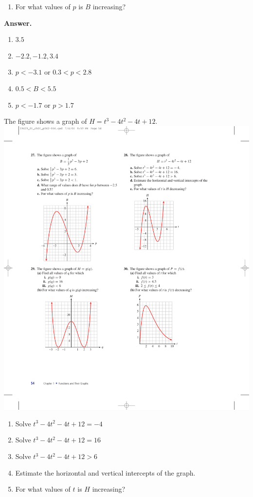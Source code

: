 \documentclass[10pt,]{book}
\theoremstyle{plain}
\theoremstyle{definition}
\theoremstyle{definition}
\theoremstyle{definition}
\theoremstyle{definition}
\numberwithin{equation}{part}
\newcommand{\lt}{<}
\newcommand{\gt}{>}
\begin{document}
\begin{exerciselist}
\begin{exercisegroup}
\begin{enumerate}[label=*\alph**]
\item\hypertarget{li-789}{}For what values of \(p\) is \(B\) increasing?%
\end{enumerate}
%
\par\smallskip
\noindent\textbf{Answer.}\hypertarget{answer-106}{}\quad
\leavevmode%
\begin{enumerate}[label=*\alph**]
\item\hypertarget{li-790}{}\(3.5\)%
\item\hypertarget{li-791}{}\(-2.2, -1.2, 3.4\)%
\item\hypertarget{li-792}{}\(p\lt -3.1\) or \(0.3\lt p\lt 2.8\)%
\item\hypertarget{li-793}{}\(0.5\lt B\lt 5.5\)%
\item\hypertarget{li-794}{}\(p\lt -1.7\) or \(p\gt 1.7\)%
\end{enumerate}
%
\exercise[28.]\hypertarget{exercise-185}{}The figure shows a graph of \(H = t^3 - 4t^2 - 4t + 12\). \includegraphics[width=0.45\linewidth]{images/fig-ex-1-3-28}
 \leavevmode%
\begin{enumerate}[label=*\alph**]
\item\hypertarget{li-795}{}Solve \(t^3 - 4t^2 - 4t + 12 = -4\)%
\item\hypertarget{li-796}{}Solve \(t^3 - 4t^2 - 4t + 12=16\)%
\item\hypertarget{li-797}{}Solve \(t^3 - 4t^2 - 4t + 12\gt 6\)%
\item\hypertarget{li-798}{}Estimate the horizontal and vertical intercepts of the graph.%
\item\hypertarget{li-799}{}For what values of \(t\) is \(H\) increasing?%
\end{enumerate}
%

\end{exercisegroup}
\end{exerciselist}
\end{document}
